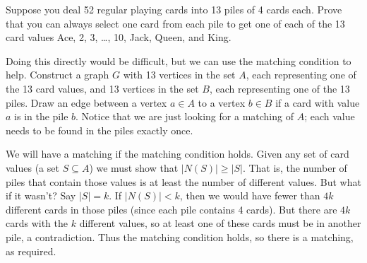 \documentclass[12pt]{article}
\begin{document}
\begin{example}
Suppose you deal 52 regular playing cards into 13 piles of 4 cards each.  Prove that you can always select one card from each pile to get one of each of the 13 card values Ace, 2, 3, \ldots, 10, Jack, Queen, and King.

\begin{solution}
	Doing this directly would be difficult, but we can use the matching condition to help.  Construct a graph $G$ with 13 vertices in the set $A$, each representing one of the 13 card values, and 13 vertices in the set $B$, each representing one of the 13 piles.  Draw an edge between a vertex $a \in A$ to a vertex $b \in B$ if a card with value $a$ is in the pile $b$.  Notice that we are just looking for a matching of $A$; each value needs to be found in the piles exactly once.
	
	We will have a matching if the matching condition holds.  Given any set of card values (a set $S \subseteq A$) we must show that $|N(S)| \ge |S|$.  That is, the number of piles that contain those values is at least the number of different values. But what if it wasn't?  Say $|S| = k$.  If $|N(S)| < k$, then we would have fewer than $4k$ different cards in those piles (since each pile contains 4 cards).  But there are $4k$ cards with the $k$ different values, so at least one of these cards must be in another pile, a contradiction.  Thus the matching condition holds, so there is a matching, as required.
\end{solution}

\end{example}
\end{document}
